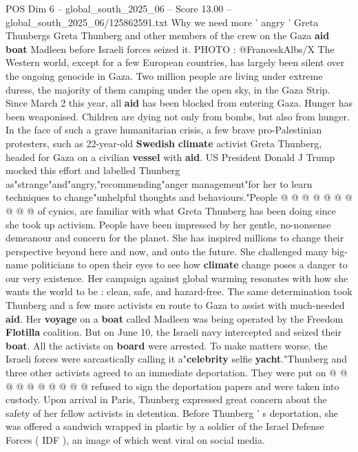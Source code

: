 \begin{textsample}{POS Dim 6 – global\_south\_2025\_06 – Score 13.00 – global\_south\_2025\_06/125862591.txt}  \label{ex:f6_pos_020}
Why we need more ' angry ' Greta Thunbergs Greta Thunberg and other members of the crew on the Gaza \textbf{aid} \textbf{boat} Madleen before Israeli forces seized it.
PHOTO : @FranceskAlbs/X The Western world, except for a few European countries, has largely been silent over the ongoing genocide in Gaza.
Two million people are living under extreme duress, the majority of them camping under the open sky, in the Gaza Strip.
Since March 2 this year, all \textbf{aid} has been blocked from entering Gaza.
Hunger has been weaponised.
Children are dying not only from bombs, but also from hunger.
In the face of such a grave humanitarian crisis, a few brave pro-Palestinian protesters, such as 22-year-old \textbf{Swedish} \textbf{climate} activist Greta Thunberg, headed for Gaza on a civilian \textbf{vessel} with \textbf{aid}.
US President Donald J Trump mocked this effort and labelled Thunberg as"strange"and"angry,"recommending"anger management"for her to learn techniques to change"unhelpful thoughts and behaviours."People @ @ @ @ @ @ @ @ @ @ of cynics, are familiar with what Greta Thunberg has been doing since she took up activism.
People have been impressed by her gentle, no-nonsense demeanour and concern for the planet.
She has inspired millions to change their perspective beyond here and now, and onto the future.
She challenged many big-name politicians to open their eyes to see how \textbf{climate} change poses a danger to our very existence.
Her campaign against global warming resonates with how she wants the world to be : clean, safe, and hazard-free.
The same determination took Thunberg and a few more activists en route to Gaza to assist with much-needed \textbf{aid}.
Her \textbf{voyage} on a \textbf{boat} called Madleen was being operated by the Freedom \textbf{Flotilla} coalition.
But on June 10, the Israeli navy intercepted and seized their \textbf{boat}.
All the activists on \textbf{board} were arrested.
To make matters worse, the Israeli forces were sarcastically calling it a"\textbf{celebrity} selfie \textbf{yacht}."Thunberg and three other activists agreed to an immediate deportation.
They were put on @ @ @ @ @ @ @ @ @ @ refused to sign the deportation papers and were taken into custody.
Upon arrival in Paris, Thunberg expressed great concern about the safety of her fellow activists in detention.
Before Thunberg ' s deportation, she was offered a sandwich wrapped in plastic by a soldier of the Israel Defense Forces ( IDF ), an image of which went viral on social media.

\end{textsample}
